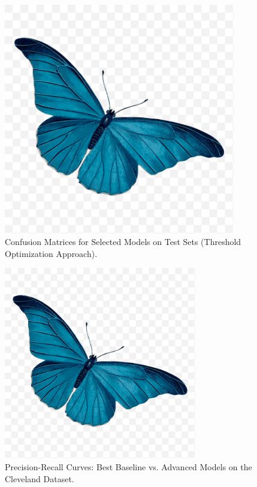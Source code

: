 \documentclass{article}
\begin{document}
\begin{figure}[htbp]
    \centering
    \includegraphics[width=0.9\textwidth]{f1-type-dataset-catplot.png} %
    \caption{Confusion Matrices for Selected Models on Test Sets (Threshold Optimization Approach).}
    \label{fig:confusion_matrices_grid}
\end{figure}

\begin{figure}[htbp]
    \centering
    \includegraphics[width=0.75\textwidth]{f1-type-dataset-catplot.png} %
    \caption{Precision-Recall Curves: Best Baseline vs. Advanced Models on the Cleveland Dataset.}
    \label{fig:pr_curve_cleveland}
\end{figure}
\end{document}
